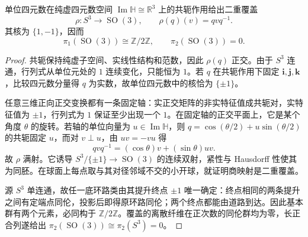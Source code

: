 \begin{lemma}\label{g2:lem:quaternion-rotation-cover}
	单位四元数在纯虚四元数空间 \(\operatorname{Im}\mathbb H\cong\mathbb R^3\) 上的共轭作用给出二重覆盖
	\[
		\rho:S^3\longrightarrow\operatorname{SO}(3),\qquad\rho(q)(v)=qvq^{-1}.
	\]
	其核为 \(\{1,-1\}\)，因而
	\[
		\pi_1(\operatorname{SO}(3))\cong\mathbb Z/2\mathbb Z,\qquad\pi_2(\operatorname{SO}(3))=0.
	\]
\end{lemma}
\begin{proof}
	共轭保持纯虚子空间、实线性结构和范数，因此 \(\rho(q)\) 正交。由于 \(S^3\) 连通，行列式从单位元处的 \(1\) 连续变化，只能恒为 \(1\)。若 \(q\) 在共轭作用下固定 \(\mathbf i,\mathbf j,\mathbf k\)，比较四元数分量得 \(q\) 为实数，故单位四元数中的核恰为 \(\{\pm1\}\)。

	任意三维正向正交变换都有一条固定轴：实正交矩阵的非实特征值成共轭对，实特征值为 \(\pm1\)，行列式为 \(1\) 保证至少出现一个 \(1\)。在固定轴的正交平面上，它是某个角度 \(\theta\) 的旋转。若轴的单位向量为 \(u\in\operatorname{Im}\mathbb H\)，则 \(q=\cos(\theta/2)+u\sin(\theta/2)\) 的共轭固定 \(u\)，而对 \(v\perp u\)，由 \(uv=-vu\) 得
	\[
		qvq^{-1}=(\cos\theta)v+(\sin\theta)uv.
	\]
	故 \(\rho\) 满射。它诱导 \(S^3/\{\pm1\}\rightarrow\operatorname{SO}(3)\) 的连续双射，紧性与 Hausdorff 性使其为同胚。在球面上每点取与其对径邻域不交的小开球，就证明商映射是二重覆盖。

	源 \(S^3\) 单连通，故任一底环路类由其提升终点 \(\pm1\) 唯一确定：终点相同的两条提升之间有定端点同伦，投影后即得原环路同伦；两个终点都能由道路到达。因此基本群有两个元素，必同构于 \(\mathbb Z/2\mathbb Z\)。覆盖的离散纤维在正次数的同伦群均为零，长正合列遂给出 \(\pi_2(\operatorname{SO}(3))\cong\pi_2(S^3)=0\)。
\end{proof}

